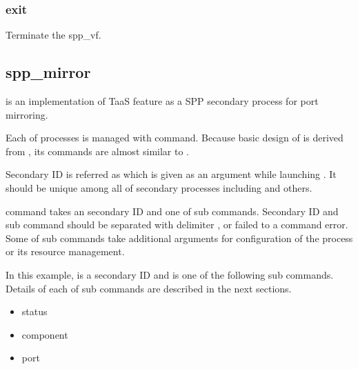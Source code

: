 \documentclass[a4paper,11pt,openany,oneside,english]{sphinxmanual}
\begin{document}
\subsubsection{exit}
\label{\detokenize{commands/secondary/spp_vf:exit}}
Terminate the spp\_vf.

\begin{sphinxVerbatim}[commandchars=\\\{\},formatcom=\footnotesize]
\end{sphinxVerbatim}


\subsection{spp\_mirror}
\label{\detokenize{commands/secondary/spp_mirror:spp-mirror}}\label{\detokenize{commands/secondary/spp_mirror:commands-spp-mirror}}\label{\detokenize{commands/secondary/spp_mirror::doc}}
 is an implementation of TaaS feature as a SPP secondary process
for port mirroring.

Each of  processes is managed with  command. Because
basic design of  is derived from , its commands are
almost similar to .

Secondary ID is referred as  which is given as an argument
while launching . It should be unique among all of secondary
processes including  and others.

 command takes an secondary ID and one of sub commands. Secondary ID
and sub command should be separated with delimiter \sphinxcode{\sphinxupquote{;}}, or failed to a
command error. Some of sub commands take additional arguments for
configuration of the process or its resource management.

\begin{sphinxVerbatim}[commandchars=\\\{\},formatcom=\footnotesize]
\end{sphinxVerbatim}

In this example,  is a secondary ID and  is one of the
following sub commands. Details of each of sub commands are described in the
next sections.
\begin{itemize}
\item {} 
status

\item {} 
component

\item {} 
port

\end{itemize}
\end{document}
